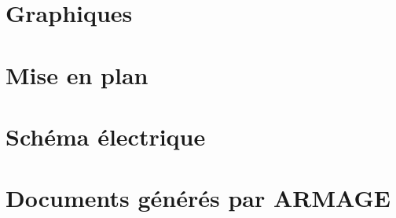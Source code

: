 \chapter{Graphiques}





\chapter{Mise en plan}










\chapter{Schéma électrique}


\chapter{Documents générés par ARMAGE}



